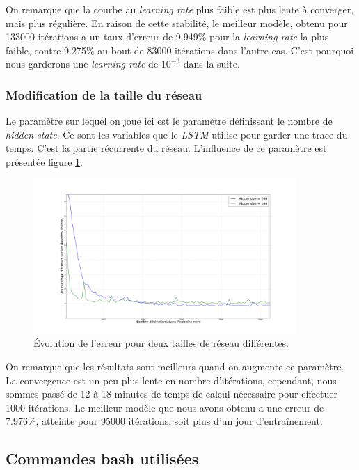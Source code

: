 \documentclass{report}
\begin{document}
On remarque que la courbe au \textit{learning rate} plus faible est plus lente à converger, mais plus régulière.
En raison de cette stabilité, le meilleur modèle, obtenu pour 133000 itérations a un taux d'erreur de 9.949\% pour la \textit{learning rate} la plus faible, contre 9.275\% au bout de 83000 itérations dans l'autre cas.
C'est pourquoi nous garderons une \textit{learning rate} de $10^{-3}$ dans la suite.

\subsubsection{Modification de la taille du réseau}

Le paramètre sur lequel on joue ici est le paramètre définissant le nombre de \textit{hidden state}.
Ce sont les variables que le \textit{LSTM} utilise pour garder une trace du temps.
C'est la partie récurrente du réseau.
L'influence de ce paramètre est présentée figure \ref{err_size}.

\begin{figure}[!h] 
    \center
    \includegraphics[width=10cm]{error_plot_size.png}
    \caption{Évolution de l'erreur pour deux tailles de réseau différentes.}
    \label{err_size}
\end{figure}

On remarque que les résultats sont meilleurs quand on augmente ce paramètre.
La convergence est un peu plus lente en nombre d'itérations, cependant, nous sommes passé de 12 à 18 minutes de temps de calcul nécessaire pour effectuer 1000 itérations.
Le meilleur modèle que nous avons obtenu a une erreur de 7.976\%, atteinte pour 95000 itérations, soit plus d'un jour d'entraînement. 

\FloatBarrier

\subsection{Commandes bash utilisées}
\end{document}

